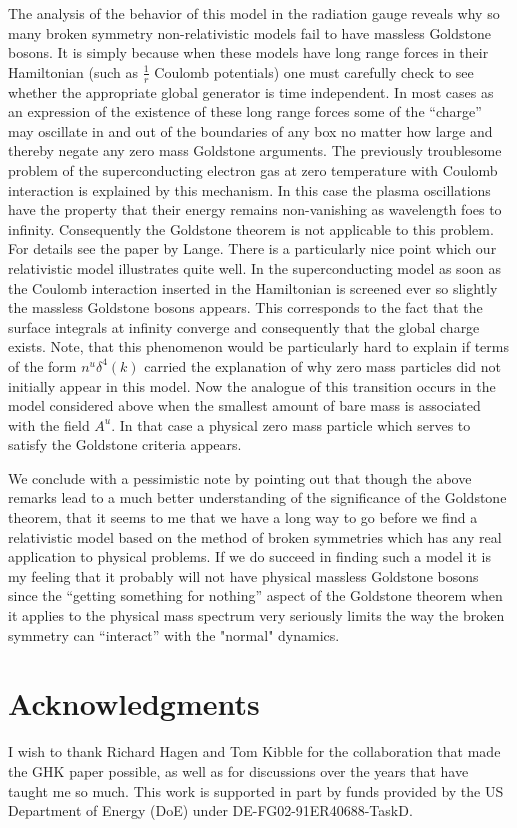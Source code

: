 \documentclass[%
  12pt,
  paper=letter,
  abstracton,
  pagesize=auto,
  version=last,
  DIV=calc
  ]{scrartcl}
\begin{document}
The analysis of the behavior of this model in the radiation gauge
reveals why so many broken symmetry non-relativistic models fail to
have massless Goldstone bosons.  It is simply because when these
models have long range forces in their Hamiltonian (such as
$\frac{1}{r}$ Coulomb potentials) one must carefully check to see
whether the appropriate global generator is time independent.  In most
cases as an expression of the existence of these long range forces
some of the ``charge'' may oscillate in and out of the boundaries of any
box no matter how large and thereby negate any zero mass Goldstone
arguments.  The previously troublesome problem of the superconducting
electron gas at zero temperature with Coulomb interaction is explained
by this mechanism. \cite{7, 13}  In this case the plasma oscillations
have the property that their energy remains non-vanishing as
wavelength foes to infinity.  Consequently the Goldstone theorem is
not applicable to this problem.  For details see the paper by Lange.
There is a particularly nice point which our relativistic model
illustrates quite well.  In the superconducting model as soon as the
Coulomb interaction inserted in the Hamiltonian is screened ever so
slightly the massless Goldstone bosons appears.  This corresponds to
the fact that the surface integrals at infinity converge and
consequently that the global charge exists.  Note, that this
phenomenon would be particularly hard to explain if terms of the form
$n^u \delta^4 (k)$ carried the explanation of why zero mass particles
did not initially appear in this model.  Now the analogue of this
transition occurs in the model considered above when the smallest
amount of bare mass is associated with the field $A^u$.  In that case
a physical zero mass particle which serves to satisfy the Goldstone
criteria appears.

We conclude with a pessimistic note by pointing out that though the
above remarks lead to a much better understanding of the significance
of the Goldstone theorem, that it seems to me that we have a long way
to go before we find a relativistic model based on the method of
broken symmetries which has any real application to physical problems.
If we do succeed in finding such a model it is my feeling that it
probably will not have physical massless Goldstone bosons since the
``getting something for nothing'' aspect of the Goldstone theorem when
it applies to the physical mass spectrum very seriously limits the way
the broken symmetry can ``interact'' with the "normal" dynamics.

\section*{Acknowledgments}
I wish to thank Richard Hagen and Tom Kibble for the collaboration that made
the GHK paper possible, as well as for discussions over the years that have
taught me so much. This work is supported in part by funds provided by the US
Department of Energy (\textsf{DoE}) under \textsf{DE-FG02-91ER40688-TaskD}.
\end{document}
